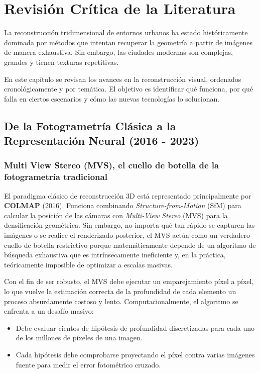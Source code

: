 \chapter{Revisión Crítica de la Literatura}

La reconstrucción tridimensional de entornos urbanos ha estado históricamente dominada por métodos que intentan recuperar la geometría a partir de imágenes de manera exhaustiva. Sin embargo, las ciudades modernas son complejas, grandes y tienen texturas repetitivas. 

En este capítulo se revisan los avances en la reconstrucción visual, ordenados cronológicamente y por temática. El objetivo es identificar qué funciona, por qué falla en ciertos escenarios y cómo las nuevas tecnologías lo solucionan.

\section{De la Fotogrametría Clásica a la Representación Neural (2016 - 2023)}

\subsection{Multi View Stereo (MVS), el cuello de botella de la fotogrametría tradicional}

El paradigma clásico de reconstrucción 3D está representado principalmente por \textbf{COLMAP} \cite{schonberger2016structure} (2016). Funciona combinando \textit{Structure-from-Motion} (SfM) para calcular la posición de las cámaras con \textit{Multi-View Stereo} (MVS) para la densificación geométrica. Sin embargo, no importa qué tan rápido se capturen las imágenes o se realice el renderizado posterior, el MVS actúa como un verdadero cuello de botella restrictivo porque matemáticamente depende de un algoritmo de búsqueda exhaustiva que es intrínsecamente ineficiente y, en la práctica, teóricamente imposible de optimizar a escalas masivas.

Con el fin de ser robusto, el MVS debe ejecutar un emparejamiento píxel a píxel, lo que vuelve la estimación correcta de la profundidad de cada elemento un proceso absurdamente costoso y lento. Computacionalmente, el algoritmo se enfrenta a un desafío masivo:
\begin{itemize}
    \item Debe evaluar cientos de hipótesis de profundidad discretizadas para cada uno de los millones de píxeles de una imagen.
    \item Cada hipótesis debe comprobarse proyectando el píxel contra varias imágenes fuente para medir el error fotométrico cruzado.
\end{itemize}

